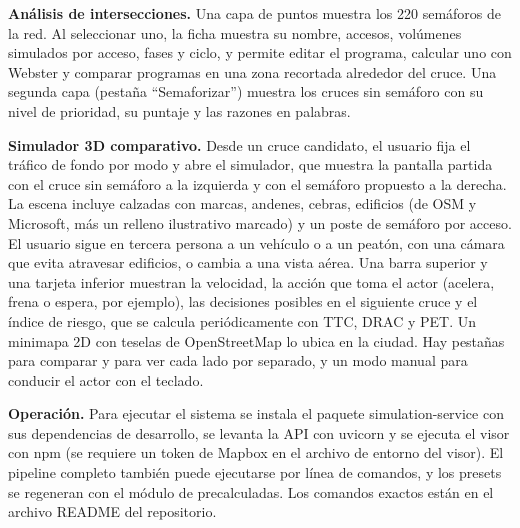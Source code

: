 \textbf{Análisis de intersecciones.} Una capa de puntos muestra los 220 semáforos de la red. Al seleccionar uno, la ficha muestra su nombre, accesos, volúmenes simulados por acceso, fases y ciclo, y permite editar el programa, calcular uno con Webster y comparar programas en una zona recortada alrededor del cruce. Una segunda capa (pestaña “Semaforizar”) muestra los cruces sin semáforo con su nivel de prioridad, su puntaje y las razones en palabras.


\textbf{Simulador 3D comparativo.} Desde un cruce candidato, el usuario fija el tráfico de fondo por modo y abre el simulador, que muestra la pantalla partida con el cruce sin semáforo a la izquierda y con el semáforo propuesto a la derecha. La escena incluye calzadas con marcas, andenes, cebras, edificios (de OSM y Microsoft, más un relleno ilustrativo marcado) y un poste de semáforo por acceso. El usuario sigue en tercera persona a un vehículo o a un peatón, con una cámara que evita atravesar edificios, o cambia a una vista aérea. Una barra superior y una tarjeta inferior muestran la velocidad, la acción que toma el actor (acelera, frena o espera, por ejemplo), las decisiones posibles en el siguiente cruce y el índice de riesgo, que se calcula periódicamente con TTC, DRAC y PET. Un minimapa 2D con teselas de OpenStreetMap lo ubica en la ciudad. Hay pestañas para comparar y para ver cada lado por separado, y un modo manual para conducir el actor con el teclado.


\textbf{Operación.} Para ejecutar el sistema se instala el paquete simulation-service con sus dependencias de desarrollo, se levanta la API con uvicorn y se ejecuta el visor con npm (se requiere un token de Mapbox en el archivo de entorno del visor). El pipeline completo también puede ejecutarse por línea de comandos, y los presets se regeneran con el módulo de precalculadas. Los comandos exactos están en el archivo README del repositorio.
